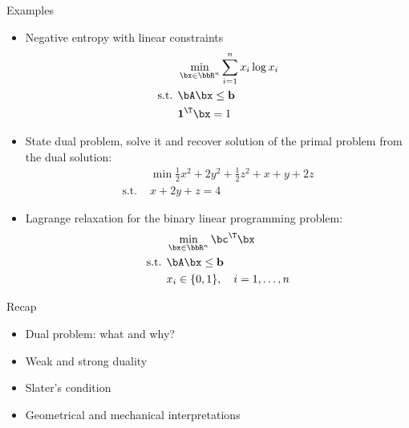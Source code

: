 \documentclass[12pt]{beamer}
\begin{document}
\begin{frame}{Examples}
\footnotesize
\begin{itemize}
\item Negative entropy with linear constraints
\vspace{-3mm}
\begin{equation*}
\begin{split}
& \min\limits_{\bx \in \bbR^n} \sum\limits_{i=1}^n x_i \log x_i\\
\text{s.t. } & \bA\bx \leq \mathbf{b}\\
& \mathbf{1}^{\T}\bx = 1
\end{split}
\end{equation*} 
\item State dual problem, solve it and recover solution of the primal problem from the dual solution:
\begin{equation*}
\begin{split}
& \min \frac{1}{2}x^2 + 2y^2 + \frac{1}{2}z^2 + x + y + 2z\\
\text{s.t. } & x+2y+z = 4
\end{split}
\end{equation*}
\item Lagrange relaxation for the binary linear programming problem:
\begin{equation*}
\begin{split}
&\min\limits_{\bx \in \bbR^n} \bc^{\T}\bx\\
\text{s.t. } & \bA \bx \leq \mathbf{b}\\
& x_i \in \{0,1 \}, \quad i = 1,\ldots,n
\end{split}
\end{equation*}
\end{itemize}
\end{frame}

\begin{frame}{Recap}
\begin{itemize}
\item Dual problem: what and why?
\item Weak and strong duality
\item Slater's condition
\item Geometrical and mechanical interpretations 
\end{itemize}
\end{frame}
\end{document}
